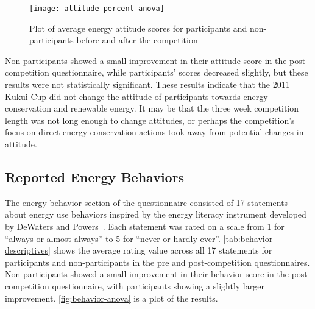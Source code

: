 \begin{figure}[htbp]
	\centering
		\texttt{[image: attitude-percent-anova]}
		\caption[Plot of energy attitudes before and after competition]{Plot of average energy attitude scores for participants and non-participants before and after the competition}
\label{fig:attitude-anova}
\end{figure}

Non-participants showed a small improvement in their attitude score in the post-competition questionnaire, while participants' scores decreased slightly, but these results were not statistically significant. These results indicate that the 2011 Kukui Cup did not change the attitude of participants towards energy conservation and renewable energy. It may be that the three week competition length was not long enough to change attitudes, or perhaps the competition's focus on direct energy conservation actions took away from potential changes in attitude.




\subsection{Reported Energy Behaviors}

The energy behavior section of the questionnaire consisted of 17 statements about energy use behaviors inspired by the energy literacy instrument developed by DeWaters and Powers~\cite{DeWaters2011}. Each statement was rated on a scale from 1 for ``always or almost always'' to 5 for ``never or hardly ever''. \autoref{tab:behavior-descriptives} shows the average rating value across all 17 statements for participants and non-participants in the pre and post-competition questionnaires. Non-participants showed a small improvement in their behavior score in the post-competition questionnaire, with participants showing a slightly larger improvement. \autoref{fig:behavior-anova} is a plot of the results.

